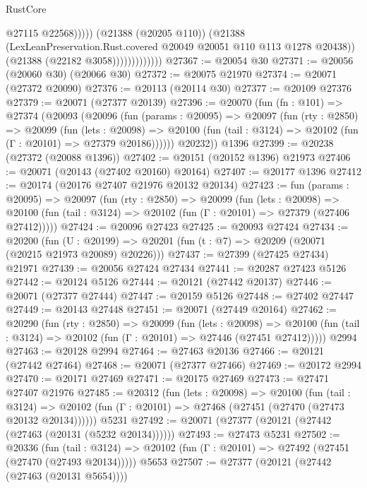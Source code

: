 \begin{lexlean}{RustCore}
\begin{coremodule}
                                    @27115
                                    @22568)))))
                          (@21388 (@20205 @110))
                          (@21388
                            (LexLeanPreservation.Rust.covered @20049 @20051 @110 @113 @1278 @20438))
                          (@21388 (@22182 @3058)))))))))))))
@27367 := @20054 @30
@27371 := @20056 (@20060 @30) (@20066 @30)
@27372 := @20075 @21970
@27374 := @20071 (@27372 @20090)
@27376 := @20113 (@20114 @30)
@27377 := @20109 @27376
@27379 := @20071 (@27377 @20139)
@27396 := @20070
    (fun (fn : @101) =>
    @27374
      (@20093
        (@20096
          (fun (params : @20095) =>
          @20097
            (fun (rty : @2850) =>
            @20099
              (fun (lets : @20098) =>
              @20100 (fun (tail : @3124) => @20102 (fun (Γ : @20101) => @27379 @20186))))))
        @20232))
    @1396
@27399 := @20238 (@27372 (@20088 @1396))
@27402 := @20151 (@20152 @1396) @21973
@27406 := @20071 (@20143 (@27402 @20160) @20164)
@27407 := @20177 @1396
@27412 := @20174 (@20176 @27407 @21976 @20132 @20134)
@27423 := fun (params : @20095) =>
  @20097
    (fun (rty : @2850) =>
    @20099
      (fun (lets : @20098) =>
      @20100 (fun (tail : @3124) => @20102 (fun (Γ : @20101) => @27379 (@27406 @27412)))))
@27424 := @20096 @27423
@27425 := @20093 @27424
@27434 := @20200
    (fun (U : @20199) => @20201 (fun (t : @7) => @20209 (@20071 (@20215 @21973 @20089) @20226)))
@27437 := @27399 (@27425 @27434) @21971
@27439 := @20056 @27424 @27434
@27441 := @20287 @27423 @5126
@27442 := @20124 @5126
@27444 := @20121 (@27442 @20137)
@27446 := @20071 (@27377 @27444)
@27447 := @20159 @5126
@27448 := @27402 @27447
@27449 := @20143 @27448
@27451 := @20071 (@27449 @20164)
@27462 := @20290
    (fun (rty : @2850) =>
    @20099
      (fun (lets : @20098) =>
      @20100 (fun (tail : @3124) => @20102 (fun (Γ : @20101) => @27446 (@27451 @27412)))))
    @2994
@27463 := @20128 @2994
@27464 := @27463 @20136
@27466 := @20121 (@27442 @27464)
@27468 := @20071 (@27377 @27466)
@27469 := @20172 @2994
@27470 := @20171 @27469
@27471 := @20175 @27469
@27473 := @27471 @27407 @21976
@27485 := @20312
    (fun (lets : @20098) =>
    @20100
      (fun (tail : @3124) =>
      @20102 (fun (Γ : @20101) => @27468 (@27451 (@27470 (@27473 @20132 @20134))))))
    @5231
@27492 := @20071 (@27377 (@20121 (@27442 (@27463 (@20131 (@5232 @20134))))))
@27493 := @27473 @5231
@27502 := @20336
    (fun (tail : @3124) => @20102 (fun (Γ : @20101) => @27492 (@27451 (@27470 (@27493 @20134)))))
    @5653
@27507 := @27377 (@20121 (@27442 (@27463 (@20131 @5654))))

\end{coremodule}
\end{lexlean}
